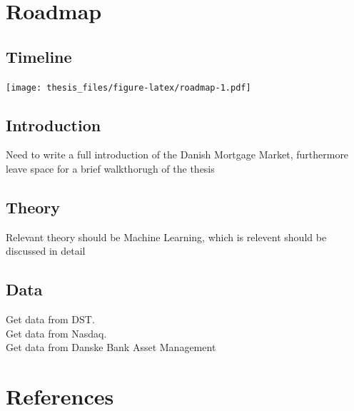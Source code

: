 \documentclass[12pt,twoside]{reedthesis}
\begin{document}
\hypertarget{roadmap}{%
\chapter*{Roadmap}\label{roadmap}}

\hypertarget{timeline}{%
\section*{Timeline}\label{timeline}}

\texttt{[image: thesis\_files/figure-latex/roadmap-1.pdf]}

\hypertarget{introduction}{%
\section*{Introduction}\label{introduction}}

Need to write a full introduction of the Danish Mortgage Market, furthermore
leave space for a brief walkthorugh of the thesis

\hypertarget{theory-1}{%
\section*{Theory}\label{theory-1}}

Relevant theory should be Machine Learning, which is relevent should be discussed
in detail

\hypertarget{data-1}{%
\section*{Data}\label{data-1}}

Get data from DST.\\
Get data from Nasdaq.\\
Get data from Danske Bank Asset Management

\backmatter

\hypertarget{references}{%
\chapter*{References}\label{references}}


\noindent
\end{document}
